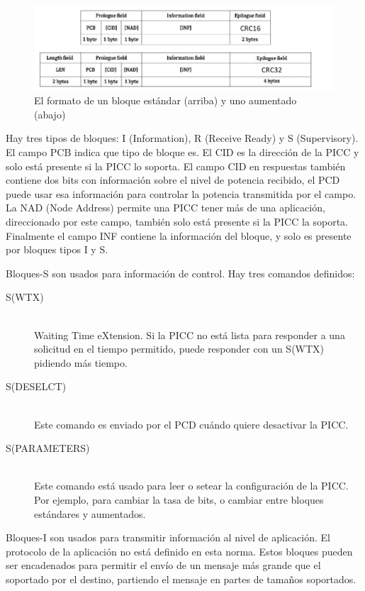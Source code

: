 \documentclass[a4paper, twoside, 11pt]{report}
\begin{document}
\begin{figure}[htb]
  \centering
  \includegraphics[scale=0.52]{./img/bloque_formats}
  \caption{El formato de un bloque estándar (arriba) y uno aumentado (abajo)~\cite{iso14443-4}}
  \label{fig:std_enhanced_blocks}
\end{figure}

Hay tres tipos de bloques: I (Information), R (Receive Ready) y S (Supervisory). El campo PCB indica que tipo de bloque es. El CID es la dirección de la PICC y solo está presente si la PICC lo soporta. El campo CID en respuestas también contiene dos bits con información sobre el nivel de potencia recibido, el PCD puede usar esa información para controlar la potencia transmitida por el campo. La NAD (Node Address) permite una PICC tener más de una aplicación, direccionado por este campo, también solo está presente si la PICC la soporta. Finalmente el campo INF contiene la información del bloque, y solo es presente por bloques tipos I y S.

Bloques-S son usados para información de control. Hay tres comandos definidos:

\begin{description}
  \item[S(WTX)] \hfill \\ Waiting Time eXtension. Si la PICC no está lista para responder a una solicitud en el tiempo permitido, puede responder con un S(WTX) pidiendo más tiempo.
  \item[S(DESELCT)] \hfill \\ Este comando es enviado por el PCD cuándo quiere desactivar la PICC.
  \item[S(PARAMETERS)] \hfill \\ Este comando está usado para leer o setear la configuración de la PICC. Por ejemplo, para cambiar la tasa de bits, o cambiar entre bloques estándares y aumentados.
\end{description}

Bloques-I son usados para transmitir información al nivel de aplicación. El protocolo de la aplicación no está definido en esta norma. Estos bloques pueden ser encadenados para permitir el envío de un mensaje más grande que el soportado por el destino, partiendo el mensaje en partes de tamaños soportados.
\end{document}
